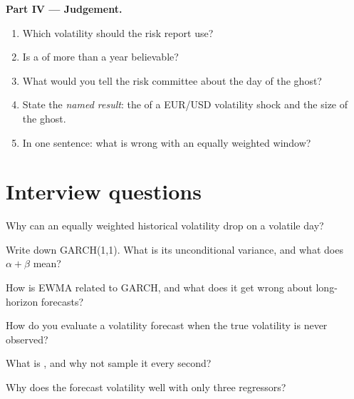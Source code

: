 \begin{problem}
\medskip\noindent\textbf{Part IV --- Judgement.}
\begin{enumerate}[resume]
\item Which volatility should the risk report use?
\item Is a  of more than a year believable?
\item What would you tell the risk committee about the day of the ghost?
\item State the \emph{named result}: the  of a EUR/USD volatility shock and the size of the ghost.
\item In one sentence: what is wrong with an equally weighted window?
\end{enumerate}
\end{problem}

\section{Interview questions}

\begin{interviewq}\label{iq:qm:volatility-models:1}
Why can an equally weighted historical volatility drop on a volatile day?
\end{interviewq}

\begin{interviewq}\label{iq:qm:volatility-models:2}
Write down GARCH(1,1). What is its unconditional variance, and what does $\alpha + \beta$ mean?
\end{interviewq}

\begin{interviewq}\label{iq:qm:volatility-models:3}
How is EWMA related to GARCH, and what does it get wrong about long-horizon forecasts?
\end{interviewq}

\begin{interviewq}\label{iq:qm:volatility-models:4}
How do you evaluate a volatility forecast when the true volatility is never observed?
\end{interviewq}

\begin{interviewq}\label{iq:qm:volatility-models:5}
What is , and why not sample it every second?
\end{interviewq}

\begin{interviewq}\label{iq:qm:volatility-models:6}
Why does the  forecast volatility well with only three regressors?
\end{interviewq}

